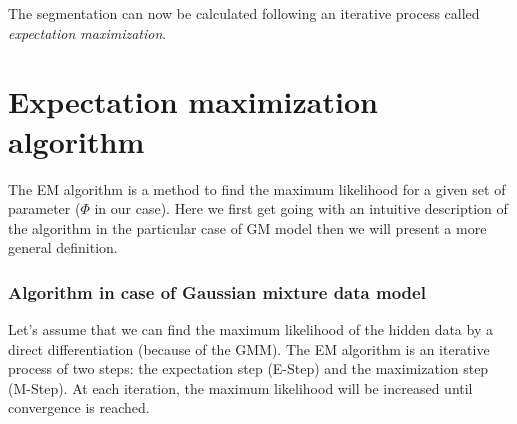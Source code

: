 \par
The segmentation can now be calculated following an iterative process called \textit{expectation maximization}.
%
\section{Expectation maximization algorithm}
The EM algorithm is a method to find the maximum likelihood for a given set of parameter ($\Phi$ in our case). Here we first get going with an 
intuitive description of the algorithm in the particular case of GM model then we will present a more general definition.
%
\subsubsection{Algorithm in case of Gaussian mixture data model}
Let's assume that we can find the maximum likelihood of the hidden data by a direct differentiation (because of the GMM). The EM algorithm is an iterative process of two steps: the expectation step (E-Step) and the maximization step (M-Step). At each iteration, the maximum likelihood will be increased until convergence is reached.\\
